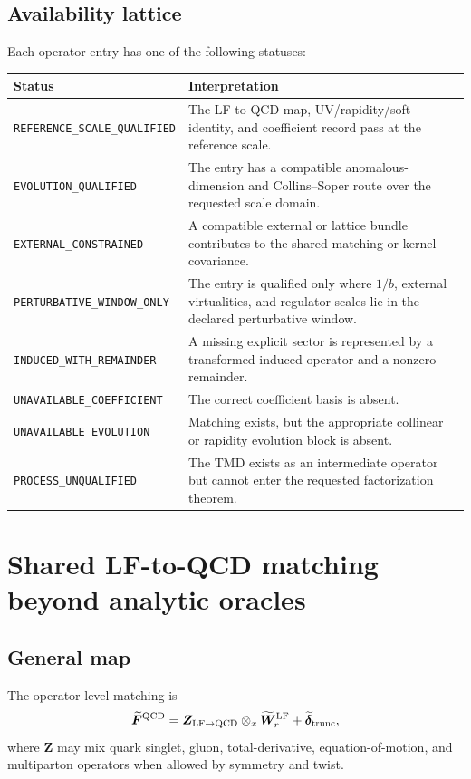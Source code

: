 \documentclass[11pt]{article}
\newcommand{\LF}{\mathrm{LF}}
\newcommand{\QCD}{\mathrm{QCD}}
\newcommand{\otimesx}{\mathbin{\otimes_x}}
\begin{document}
\subsection{Availability lattice}

Each operator entry has one of the following statuses:
\begin{longtable}{L{0.30\textwidth}L{0.62\textwidth}}
\toprule
Status & Interpretation\\
\midrule
\endhead
\texttt{REFERENCE\_SCALE\_QUALIFIED} & The LF-to-QCD map, UV/rapidity/soft identity, and coefficient record pass at the reference scale.\\
\texttt{EVOLUTION\_QUALIFIED} & The entry has a compatible anomalous-dimension and Collins--Soper route over the requested scale domain.\\
\texttt{EXTERNAL\_CONSTRAINED} & A compatible external or lattice bundle contributes to the shared matching or kernel covariance.\\
\texttt{PERTURBATIVE\_WINDOW\_ONLY} & The entry is qualified only where \(1/b\), external virtualities, and regulator scales lie in the declared perturbative window.\\
\texttt{INDUCED\_WITH\_REMAINDER} & A missing explicit sector is represented by a transformed induced operator and a nonzero remainder.\\
\texttt{UNAVAILABLE\_COEFFICIENT} & The correct coefficient basis is absent.\\
\texttt{UNAVAILABLE\_EVOLUTION} & Matching exists, but the appropriate collinear or rapidity evolution block is absent.\\
\texttt{PROCESS\_UNQUALIFIED} & The TMD exists as an intermediate operator but cannot enter the requested factorization theorem.\\
\bottomrule
\end{longtable}

\section{Shared LF-to-QCD matching beyond analytic oracles}
\label{sec:matching}

\subsection{General map}

The operator-level matching is
\begin{equation}
 \widetilde{\bm F}^{\QCD}
 =
 \bm Z_{\LF\to\QCD}
 \otimesx
 \widetilde{\bm W}^{\LF}_{r}
 +
 \widetilde{\bm\delta}_{\rm trunc},
 \label{eq:general-matching}
\end{equation}
where \(\bm Z\) may mix quark singlet, gluon, total-derivative, equation-of-motion, and multiparton operators when allowed by symmetry and twist.
\end{document}
